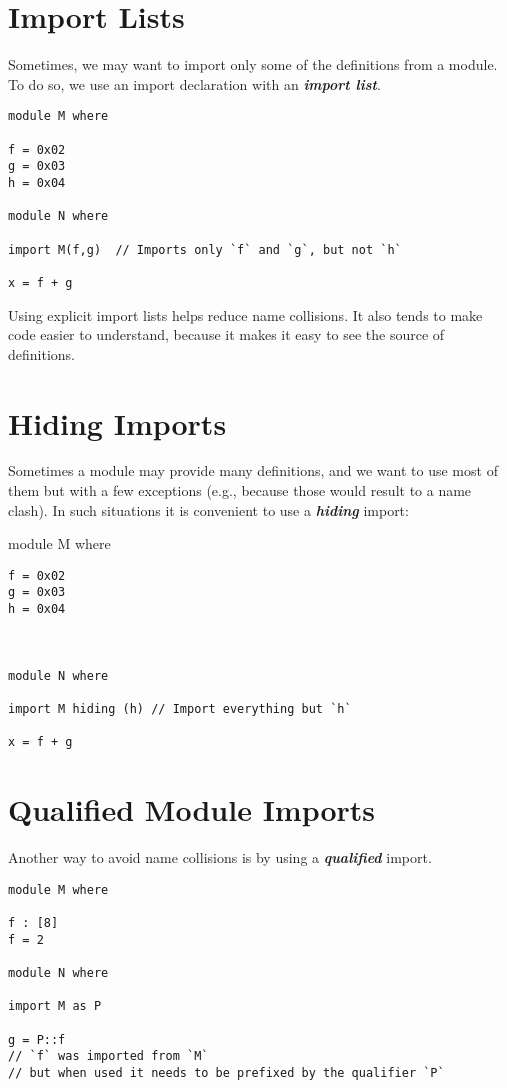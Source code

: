 \hypertarget{import-lists}{%
\section{Import Lists}\label{import-lists}}

Sometimes, we may want to import only some of the definitions from a
module. To do so, we use an import declaration with an
\textbf{\emph{import list}}.

\begin{verbatim}
module M where

f = 0x02
g = 0x03
h = 0x04

module N where

import M(f,g)  // Imports only `f` and `g`, but not `h`

x = f + g
\end{verbatim}

Using explicit import lists helps reduce name collisions. It also tends
to make code easier to understand, because it makes it easy to see the
source of definitions.

\hypertarget{hiding-imports}{%
\section{Hiding Imports}\label{hiding-imports}}

Sometimes a module may provide many definitions, and we want to use most
of them but with a few exceptions (e.g., because those would result to a
name clash). In such situations it is convenient to use a
\textbf{\emph{hiding}} import:

module M where

\begin{verbatim}
f = 0x02
g = 0x03
h = 0x04



module N where

import M hiding (h) // Import everything but `h`

x = f + g
\end{verbatim}

\hypertarget{qualified-module-imports}{%
\section{Qualified Module Imports}\label{qualified-module-imports}}

Another way to avoid name collisions is by using a
\textbf{\emph{qualified}} import.

\begin{verbatim}
module M where

f : [8]
f = 2

module N where

import M as P

g = P::f
// `f` was imported from `M`
// but when used it needs to be prefixed by the qualifier `P`
\end{verbatim}

